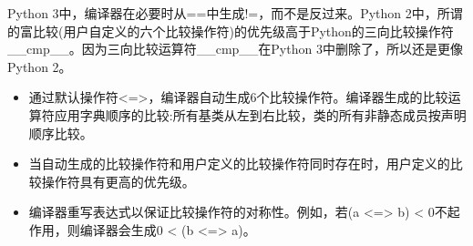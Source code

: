 \begin{tcolorbox}[breakable,enhanced jigsaw,colback=blue!5!white,colframe=blue!75!black,title={与Python的相似性}]
Python 3中，编译器在必要时从==中生成!=，而不是反过来。Python 2中，所谓的富比较(用户自定义的六个比较操作符)的优先级高于Python的三向比较操作符\_\_cmp\_\_。因为三向比较运算符\_\_cmp\_\_在Python 3中删除了，所以还是更像Python 2。
\end{tcolorbox}	

\begin{tcolorbox}[breakable,enhanced jigsaw,colback=mygreen!5!white,colframe=mygreen!75!black,title={总结}]
\begin{itemize}
\item 
通过默认操作符<=>，编译器自动生成6个比较操作符。编译器生成的比较运算符应用字典顺序的比较:所有基类从左到右比较，类的所有非静态成员按声明顺序比较。

\item 
当自动生成的比较操作符和用户定义的比较操作符同时存在时，用户定义的比较操作符具有更高的优先级。

\item 
编译器重写表达式以保证比较操作符的对称性。例如，若(a <=> b) < 0不起作用，则编译器会生成0 < (b <=> a)。
\end{itemize}
\end{tcolorbox}	

\newpage
























